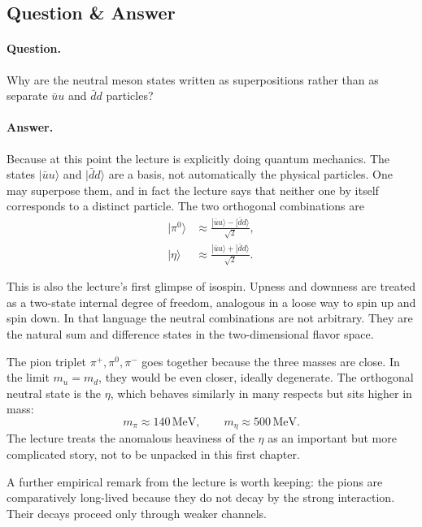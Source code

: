 \subsection{Question \& Answer}

\paragraph{Question.} Why are the neutral meson states written as superpositions rather than as separate \(\bar u u\) and \(\bar d d\) particles?

\paragraph{Answer.} Because at this point the lecture is explicitly doing quantum mechanics. The states \(|\bar u u\rangle\) and \(|\bar d d\rangle\) are a basis, not automatically the physical particles. One may superpose them, and in fact the lecture says that neither one by itself corresponds to a distinct particle. The two orthogonal combinations are
\begin{align}
|\pi^0\rangle &\approx \frac{|\bar u u\rangle-|\bar d d\rangle}{\sqrt2},\\
|\eta\rangle &\approx \frac{|\bar u u\rangle+|\bar d d\rangle}{\sqrt2}.
\end{align}

This is also the lecture's first glimpse of isospin. Upness and downness are treated as a two-state internal degree of freedom, analogous in a loose way to spin up and spin down. In that language the neutral combinations are not arbitrary. They are the natural sum and difference states in the two-dimensional flavor space.

The pion triplet \(\pi^+,\pi^0,\pi^-\) goes together because the three masses are close. In the limit \(m_u=m_d\), they would be even closer, ideally degenerate. The orthogonal neutral state is the \(\eta\), which behaves similarly in many respects but sits higher in mass:
\begin{equation}
m_\pi \approx 140\,\mathrm{MeV},
\qquad
m_\eta \approx 500\,\mathrm{MeV}.
\end{equation}
The lecture treats the anomalous heaviness of the \(\eta\) as an important but more complicated story, not to be unpacked in this first chapter.

A further empirical remark from the lecture is worth keeping: the pions are comparatively long-lived because they do not decay by the strong interaction. Their decays proceed only through weaker channels.

